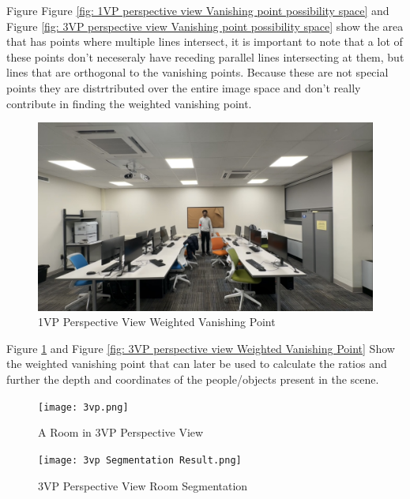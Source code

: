\documentclass[12pt]{report}
\begin{document}
Figure Figure \ref{fig: 1VP perspective view Vanishing point possibility space} and Figure \ref{fig: 3VP perspective view Vanishing point possibility space} show the area that has points where multiple lines intersect, it is important to note that a lot of these points don’t neceseraly have receding parallel lines intersecting at them, but lines that are orthogonal to the vanishing points. Because these are not special points they are distrtributed over the entire image space and don’t really contribute in finding the weighted vanishing point.\newline

\begin{figure}[H]
    \centering
    \includegraphics[width=1.0\textwidth]{1vp Centroid of Most Converged Area.png}
    \caption{1VP Perspective View Weighted Vanishing Point}
    \label{fig: 1VP perspective view Weighted Vanishing Point}
\end{figure}

Figure \ref{fig: 1VP perspective view Weighted Vanishing Point} and Figure \ref{fig: 3VP perspective view Weighted Vanishing Point} Show the weighted vanishing point that can later be used to calculate the ratios and further the depth and coordinates of the people/objects present in the scene.\newline

\begin{figure}[H]
    \centering
    \texttt{[image: 3vp.png]}
    \caption{A Room in 3VP Perspective View}
    \label{fig: A room in 3VP perspective view}
\end{figure}

\begin{figure}[H]
    \centering
    \texttt{[image: 3vp Segmentation Result.png]}
    \caption{3VP Perspective View Room Segmentation}
    \label{fig: 3VP perspective view room segmentation}
\end{figure}
\end{document}
